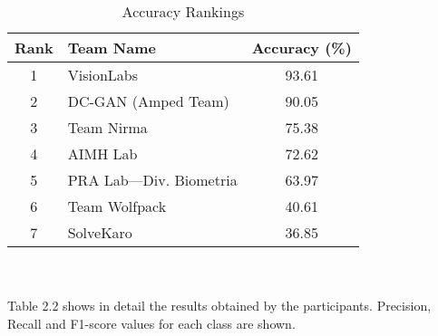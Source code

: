\begin{table}[ht]
\centering
\begin{tabular}{|c|l|c|}
\hline
\textbf{Rank} & \textbf{Team Name} & \textbf{Accuracy (\%)} \\
\hline
1 & VisionLabs & 93.61 \\
2 & DC-GAN (Amped Team) & 90.05 \\
3 & Team Nirma & 75.38 \\
4 & AIMH Lab & 72.62 \\
5 & PRA Lab—Div. Biometria & 63.97 \\
6 & Team Wolfpack & 40.61 \\
7 & SolveKaro & 36.85 \\
\hline
\end{tabular}
\caption{Accuracy Rankings}
\label{tab:accuracy-rankings}
\end{table} \\\\
Table 2.2 shows in detail the results obtained by the participants.
Precision, Recall and F1-score values for each class are shown.

